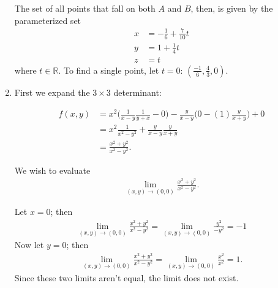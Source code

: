 \documentclass{article}
\begin{document}
\begin{enumerate}
The set of all points that fall on both $A$ and $B$, then, is
given by the parameterized set
\begin{align*}
 x &= -\frac{1}{6} + \frac{7}{10}t \\
 y &= 1 + \frac{1}{4}t \\
 z &= t
\end{align*}
where $t \in \mathbb{R}$.  To find a single point, let $t = 0$:
$(\frac{-1}{6}, \frac{4}{3}, 0)$.

\item %
First we expand the $3\times3$ determinant:

\begin{align*}
 f(x,y) &= x^2 \Big(\frac{1}{x-y} \frac{1}{y+x} - 0\Big) - \frac{y}{x-y} \Big(0 - (1) \frac{y}{x+y} \Big) + 0 \\
 &= x^2 \frac{1}{x^2-y^2} + \frac{y}{x-y}\frac{y}{x+y} \\
 &= \frac{x^2 + y^2}{x^2 - y^2}.
\end{align*}

We wish to evaluate 
\begin{align*} 
  \lim\limits_{(x,y) \to (0,0)} \frac{x^2 + y^2}{x^2 - y^2}.
\end{align*}

Let $x = 0$; then 
\begin{align*} 
  \lim\limits_{(x,y) \to (0,0)} \frac{x^2 + y^2}{x^2 - y^2} = \lim\limits_{(x,y) \to (0,0)} \frac{y^2}{-y^2} = -1
\end{align*}
Now let $y = 0$; then 
\begin{align*}
   \lim\limits_{(x,y) \to (0,0)} \frac{x^2 + y^2}{x^2 - y^2} = \lim\limits_{(x,y) \to (0,0)} \frac{x^2}{x^2} = 1.
\end{align*}
Since these two limits aren't equal, the limit does not exist.


\end{enumerate}
\end{document}
